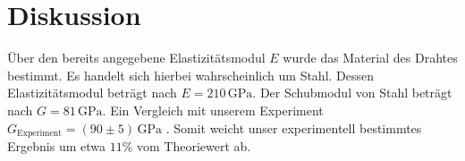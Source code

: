 \section{Diskussion}
\label{sec:Diskussion}
Über den bereits angegebene Elastizitätsmodul $E$ wurde das Material des Drahtes bestimmt.
Es handelt sich hierbei wahrscheinlich um Stahl. Dessen Elastizitätsmodul beträgt nach \cite{stahlhart} $E=210 \,\si{\giga\pascal}$.
Der Schubmodul von Stahl beträgt nach \cite{stahlhart} $G=81 \,\si{\giga\pascal}$. Ein Vergleich mit unserem Experiment $G_{\mathrm{Experiment}}=(90 \pm 5) \,\si{\giga\pascal}$ .
Somit weicht unser experimentell bestimmtes Ergebnis um etwa $11\%$ vom Theoriewert ab.
